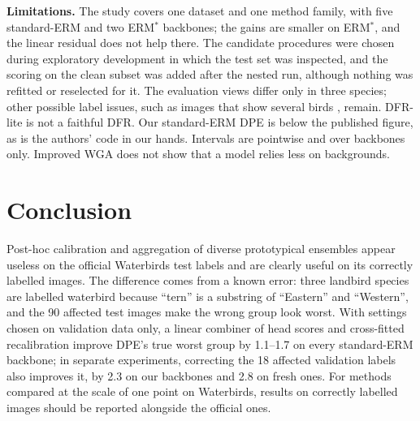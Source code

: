 \textbf{Limitations.} The study covers one dataset and one method family, with five standard-ERM and two ERM$^*$ backbones; the gains are smaller on ERM$^*$, and the linear residual does not help there. The candidate procedures were chosen during exploratory development in which the test set was inspected, and the scoring on the clean subset was added after the nested run, although nothing was refitted or reselected for it. The evaluation views differ only in three species; other possible label issues, such as images that show several birds \cite{asgari2022masktune}, remain. DFR-lite is not a faithful DFR. Our standard-ERM DPE is below the published figure, as is the authors' code in our hands. Intervals are pointwise and over backbones only. Improved WGA does not show that a model relies less on backgrounds.

\section{Conclusion}
Post-hoc calibration and aggregation of diverse prototypical ensembles appear useless on the official Waterbirds test labels and are clearly useful on its correctly labelled images. The difference comes from a known error: three landbird species are labelled waterbird because ``tern'' is a substring of ``Eastern'' and ``Western'', and the 90 affected test images make the wrong group look worst. With settings chosen on validation data only, a linear combiner of head scores and cross-fitted recalibration improve DPE's true worst group by 1.1--1.7\pp{} on every standard-ERM backbone; in separate experiments, correcting the 18 affected validation labels also improves it, by 2.3\pp{} on our backbones and 2.8\pp{} on fresh ones. For methods compared at the scale of one point on Waterbirds, results on correctly labelled images should be reported alongside the official ones.
